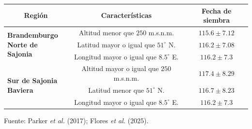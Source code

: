 \documentclass[aspectratio=169]{beamer}
\begin{document}
\begin{frame}
	\begin{table}[H]
		\centering
		\begin{tabular}{l|c|c}
			\hline
			\multicolumn{1}{c|}{\textbf{Región}} & \textbf{Características} & \textbf{Fecha de siembra} \\ \hline
			
			\multirow{3}{*}{\parbox{3.5cm}{\textbf{Brandemburgo}\\ \textbf{Norte de Sajonia}}} 
			& Altitud menor que $250$ m.s.n.m. 
			& $115.6 \pm 7.12$ \\ \cline{2-3}
			
			
			& Latitud mayor o igual que $51^\circ$ N. 
			& $116.2 \pm 7.08$ \\ \cline{2-3}
			
			& Longitud mayor o igual que $8.5^\circ$ E. 
			& $116.2 \pm 7.3$ \\ \hline
			
			
			\multirow{3}{*}{\parbox{3.5cm}{\textbf{Sur de Sajonia}\\ \textbf{Baviera}}}  
			& Altitud mayor o igual que $250$ m.s.n.m. 
			& $117.4 \pm 8.29$ \\ \cline{2-3}
			
			
			& Latitud menor que $51^\circ$ N. 
			& $116.7 \pm 8.23$ \\ \cline{2-3}
			
			& Longitud mayor o igual que $8.5^\circ$ E. 
			& $116.2 \pm 7.3$ \\ \hline
			
		\end{tabular}
		\tiny{Fuente: Parker \textit{et al.} (2017); Flores \textit{et al.} (2025).}
		\label{Real_data}
	\end{table}
\end{frame}
\end{document}
